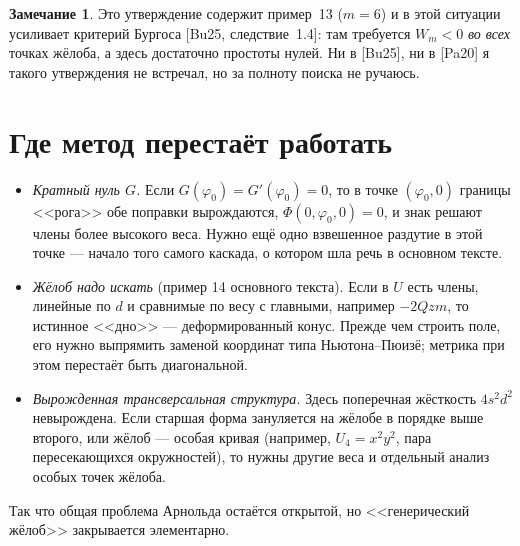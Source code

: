 \documentclass[11pt,a4paper]{article}
\theoremstyle{definition}
\newtheorem{remark}{Замечание}
\begin{document}
\begin{remark}
Это утверждение содержит пример~13 ($m=6$) и в этой ситуации усиливает критерий Бургоса [Bu25, следствие~1.4]:
там требуется $W_m<0$ \emph{во всех} точках жёлоба, а здесь достаточно простоты нулей. Ни в [Bu25], ни в [Pa20]
я такого утверждения не встречал, но за полноту поиска не ручаюсь.
\end{remark}

\section{Где метод перестаёт работать}
\begin{itemize}[leftmargin=*]
\item \emph{Кратный нуль $G$.} Если $G(\varphi_0)=G'(\varphi_0)=0$, то в точке $(\varphi_0,0)$ границы <<рога>> обе поправки
вырождаются, $\Phi(0,\varphi_0,0)=0$, и знак решают члены более высокого веса. Нужно ещё одно взвешенное раздутие в
этой точке --- начало того самого каскада, о котором шла речь в основном тексте.
\item \emph{Жёлоб надо искать} (пример 14 основного текста). Если в $U$ есть члены, линейные по $d$ и сравнимые по весу
с главными, например $-2Qzm$, то истинное <<дно>> --- деформированный конус. Прежде чем строить поле, его нужно
выпрямить заменой координат типа Ньютона--Пюизё; метрика при этом перестаёт быть диагональной.
\item \emph{Вырожденная трансверсальная структура.} Здесь поперечная жёсткость $4s^2d^2$ невырождена. Если старшая
форма зануляется на жёлобе в порядке выше второго, или жёлоб --- особая кривая (например, $U_4=x^2y^2$, пара
пересекающихся окружностей), то нужны другие веса и отдельный анализ особых точек жёлоба.
\end{itemize}
Так что общая проблема Арнольда остаётся открытой, но <<генерический жёлоб>> закрывается элементарно.
\end{document}
